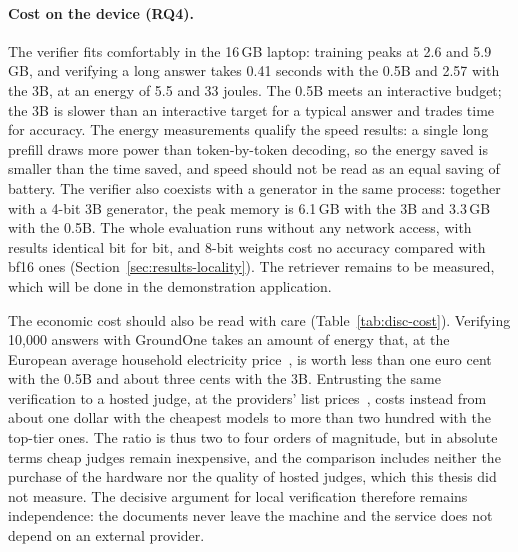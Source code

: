 \paragraph{Cost on the device (RQ4).} The verifier fits comfortably in the 16\,GB laptop: training peaks at 2.6 and
5.9\,GB, and verifying a long answer takes 0.41 seconds with the 0.5B and 2.57 with the 3B, at an energy of 5.5 and 33
joules. The 0.5B meets an interactive budget; the 3B is slower than an interactive target for a typical answer and
trades time for accuracy. The energy measurements qualify the speed results: a single long prefill draws more power than
token-by-token decoding, so the energy saved is smaller than the time saved, and speed should not be read as an equal
saving of battery. The verifier also coexists with a generator in the same process: together with a 4-bit 3B
generator, the peak memory is 6.1\,GB with the 3B and 3.3\,GB with the 0.5B. The whole evaluation runs without any
network access, with results identical bit for bit, and 8-bit weights cost no accuracy compared with bf16 ones
(Section~\ref{sec:results-locality}). The retriever remains to be measured, which will be done in the demonstration
application.

The economic cost should also be read with care (Table~\ref{tab:disc-cost}). Verifying 10{,}000 answers with GroundOne
takes an amount of energy that, at the European average household electricity price~\cite{eurostat2026electricity},
is worth less than one euro cent with the 0.5B and about three cents with the 3B. Entrusting the same verification to a
hosted judge, at the providers' list prices~\cite{anthropic2026pricing,openai2026pricing,google2026geminipricing},
costs instead from about one dollar with the cheapest models to more than two hundred with the top-tier ones. The ratio
is thus two to four orders of magnitude, but in absolute terms cheap judges remain inexpensive, and the comparison
includes neither the purchase of the hardware nor the quality of hosted judges, which this thesis did not measure. The
decisive argument for local verification therefore remains independence: the documents never leave the machine and the
service does not depend on an external provider.

